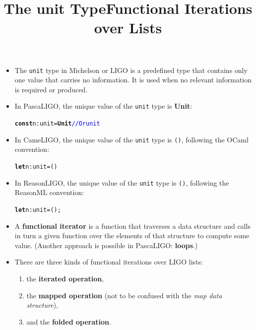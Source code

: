 \documentclass[wide]{slides}
\newcommand{\Kconst}[0]{\textbf{const}\xspace}
\newcommand{\KUnit}[0]{\textbf{Unit}\xspace}
\newcommand{\Klet}[0]{\textbf{let}\xspace}
\newcommand{\com}[1]{\textcolor{blue}{{#1}}}
\begin{document}
\begin{slide}
  \title{The unit Type}

  \begin{itemize}

    \item The \texttt{unit} type in Michelson or LIGO is a predefined
      type that contains only one value that carries no
      information. It is used when no relevant information is required
      or produced.

    \item In PascaLIGO, the unique value of the \texttt{unit} type is
      \KUnit:
      \begin{alltt}
\Kconst n : unit = \KUnit \com{// Or unit}
      \end{alltt}

    \item In CameLIGO, the unique value of the \texttt{unit} type is
      \texttt{()}, following the OCaml convention:
      \begin{alltt}
\Klet n : unit = ()
      \end{alltt}

    \item In ReasonLIGO, the unique value of the \texttt{unit} type is
      \texttt{()}, following the ReasonML convention:
      \begin{alltt}
\Klet n : unit = ();
      \end{alltt}

  \end{itemize}

\end{slide}

\begin{slide}
  \title{Functional Iterations over Lists}

  \begin{itemize}

    \item A \textbf{functional iterator} is a function that traverses
      a data structure and calls in turn a given function over the
      elements of that structure to compute some value. (Another
      approach is possible in PascaLIGO: \textbf{loops}.)

    \item There are three kinds of functional iterations over LIGO
      lists:
      \begin{enumerate}

        \item the \textbf{iterated operation},

        \item the \textbf{mapped operation} (not to be
          confused with the \emph{map data structure}),

        \item and the \textbf{folded operation}.

      \end{enumerate}

  \end{itemize}

\end{slide}
\end{document}
